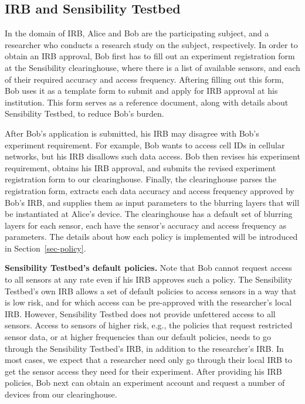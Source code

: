 \subsection{IRB and Sensibility Testbed}\label{sec-irb-policies}

In the domain of IRB, Alice and Bob are the participating subject, and 
a researcher who conducts a research study on the subject, respectively.
In order to obtain an IRB approval, Bob first has to fill out an experiment
registration form  at the 
Sensibility clearinghouse, where
there is a list of available sensors, and each of their required accuracy 
and access frequency. Aftering filling out this form, Bob uses it as 
a template form to submit and apply for IRB approval at his institution. 
This form serves as a reference document, along with details about 
Sensibility Testbed, to reduce Bob's burden. 

After Bob's application is submitted, his IRB may disagree with 
Bob's experiment requirement. For example, Bob wants to access cell 
IDs in cellular networks, but his IRB disallows such data access. Bob then
revises his experiment requirement, obtains his IRB approval, and
submits the revised experiment registration form to our clearinghouse. Finally, the clearinghouse
parses the registration form, extracts each data accuracy and access 
frequency approved by Bob's IRB, and supplies them as input parameters to
the blurring layers that will be instantiated at Alice's device. The clearinghouse
has a default set of blurring layers for each sensor, each have the 
sensor's accuracy and access frequency as parameters. The details about
how each policy is implemented will be introduced in 
Section~\ref{sec-policy}.

\textbf{Sensibility Testbed's default policies.}
Note that Bob cannot request access to all sensors at any rate
even if his IRB approves such a policy. The Sensibility Testbed's
own IRB allows a set of default policies to access sensors in a
way that is low risk, and for which access can be pre-approved with the
researcher's local IRB. However, Sensibility Testbed does not
provide unfettered access to all sensors. Access to sensors of
higher risk, e.g., the policies that request restricted sensor data, 
or at higher frequencies than our default policies, 
needs to go through the Sensibility Testbed's IRB,
in addition to the researcher's IRB. In most cases, we expect
that a researcher need only go through their local IRB to get
the sensor access they need for their experiment. After
providing his IRB policies, Bob next can obtain an experiment
account and request a number of devices from our clearinghouse.